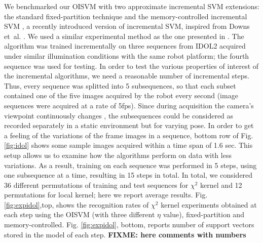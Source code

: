We benchmarked our OISVM with two approximate incremental SVM extensions:
the standard fixed-partition technique \cite{ijcai99} and the memory-controlled incremental
SVM \cite{luo:icra07}, a recently introduced version of incremental SVM, 
 inspired from Downs et~al. \cite{DownsGM01}. We used a similar experimental
method as the one presented in \cite{luo:icra07}. The algorithm was trained incrementally on
three sequences from IDOL2 acquired under similar illumination conditions with the same robot
platform; the fourth sequence was used for testing. In order to test the various properties of
interest of the incremental algorithms, we need a reasonable number of incremental steps.
Thus, every sequence was splitted into 5 subsequences, so that each subset contained one of the
five images acquired by the robot every second (image sequences were acquired at a rate of
5fps). Since during acquisition the camera's viewpoint continuously changes \cite{luo:icra07},
the subsequences could be considered as recorded separately in a static environment but for
varying pose. In order to get a feeling of the variations of the frame images in a sequence,
bottom row of Fig. \ref{fig:idol} shows some sample images acquired within a time span of 1.6 sec.
This setup allows us to examine how the algorithms perform on data with less
variations. As a result, training on each sequence was performed in 5 steps, using one subsequence
at a time, resulting in 15 steps in total. In total, we considered 36 different permutations
of training and test sequences for $\chi^2$ kernel and 12 permutations for local kernel; here
we report average results. Fig. \ref{fig:expidol},top, shows the recognition rates of $\chi^2$ kernel experiments
obtained at each step using the OISVM (with three different $\eta$ value), fixed-partition and
memory-controlled. Fig. \ref{fig:expidol}, bottom, reports number of support vectors stored in the model of
each step. \textbf{FIXME: here comments with numbers}

